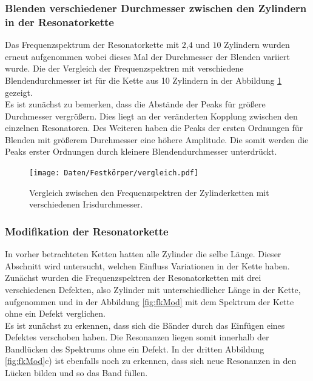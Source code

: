 \subsubsection{Blenden verschiedener Durchmesser zwischen den Zylindern in der Resonatorkette}

Das Frequenzspektrum der Resonatorkette mit $2$,$4$ und $10$ Zylindern wurden erneut aufgenommen wobei dieses Mal der Durchmesser der Blenden variiert wurde. 
Die der Vergleich der Frequenzspektren mit verschiedene Blendendurchmesser ist für die Kette aus 10 Zylindern in der Abbildung \ref{fig:fkvergleich} gezeigt. \\
Es ist zunächst zu bemerken, dass die Abstände der Peaks für größere Durchmesser vergrößern. Dies liegt an der veränderten Kopplung zwischen den einzelnen Resonatoren. 
Des Weiteren haben die Peaks der ersten Ordnungen für Blenden mit größerem Durchmesser eine höhere Amplitude. Die somit werden die Peaks erster Ordnungen durch kleinere Blendendurchmesser unterdrückt. 

\begin{figure}[H]
  \centering
  \texttt{[image: Daten/Festkörper/vergleich.pdf]}
  \caption{Vergleich zwischen den Frequenzspektren der Zylinderketten mit verschiedenen Irisdurchmesser.}
  \label{fig:fkvergleich}
\end{figure}
\subsubsection{Modifikation der Resonatorkette}

In vorher betrachteten Ketten hatten alle Zylinder die selbe Länge. 
Dieser Abschnitt wird untersucht, welchen Einfluss Variationen in der Kette haben. \\
Zunächst wurden die Frequenzspektren der Resonatorketten mit drei verschiedenen Defekten, also Zylinder mit unterschiedlicher Länge in der Kette, aufgenommen und in der Abbildung \ref{fig:fkMod} mit dem Spektrum der Kette ohne ein Defekt verglichen. \\
Es ist zunächst zu erkennen, dass sich die Bänder durch das Einfügen eines Defektes verschoben haben. Die Resonanzen liegen somit innerhalb der Bandlücken des Spektrums ohne ein Defekt. In der dritten Abbildung \ref{fig:fkMod}c) ist ebenfalls noch zu erkennen, dass sich neue Resonanzen in den Lücken bilden und so das Band füllen. 

